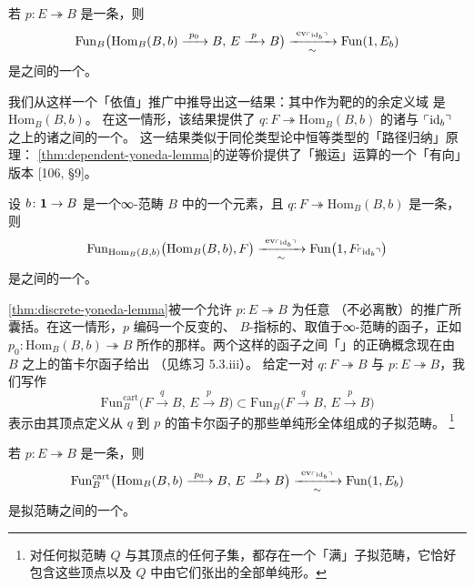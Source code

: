 \begin{theorem}[离散 Yoneda 引理]\label{thm:discrete-yoneda-lemma}
若 $p\colon E\twoheadrightarrow B$ 是一条\trDiscreteCartesianFibration，则
\[
\mathrm{Fun}_{B}\bigl(\mathrm{Hom}_{B}(B,b)\xrightarrow{\ p_{0}\ }B,\,
E\xrightarrow{\ p\ }B\bigr)
\xrightarrow[\ \sim\ ]{\ \mathrm{ev}_{\qcor{\mathrm{id}_{b}}}\ }
\mathrm{Fun}(1,E_{b})
\]
是\trKanComplex{}之间的一个\trEquivalence。
\end{theorem}

我们从这样一个「依值」推广中推导出这一结果：其中作为靶的\trDiscreteCartesianFibration{}的余定义域
是 $\mathrm{Hom}_{B}(B,b)$。
在这一情形，该结果提供了\trDiscreteCartesianFibration
$q\colon F\twoheadrightarrow\mathrm{Hom}_{B}(B,b)$ 的诸\trSection{}与
$\ulcorner\mathrm{id}_{b}\urcorner$ 之上\trFiber{}的诸\trElement{}之间的一个\trEquivalence。
这一结果类似于同伦类型论中恒等类型的「路径归纳」原理：
\cref{thm:dependent-yoneda-lemma}的逆等价提供了「搬运」运算的一个「有向」版本
[106, §9]。

\begin{theorem}[依值 Yoneda 引理]\label{thm:dependent-yoneda-lemma}
设 $b\colon\mathbf{1}\to B$ 是一个∞-范畴 $B$ 中的一个元素，且
$q\colon F\twoheadrightarrow\mathrm{Hom}_{B}(B,b)$ 是一条\trDiscreteCartesianFibration，则
\[
\mathrm{Fun}_{\mathrm{Hom}_{B}(B,b)}\bigl(\mathrm{Hom}_{B}(B,b),F\bigr)
\xrightarrow[\ \sim\ ]{\ \mathrm{ev}_{\ulcorner\mathrm{id}_{b}\urcorner}\ }
\mathrm{Fun}\bigl(1,F_{\ulcorner\mathrm{id}_{b}\urcorner}\bigr)
\]
是\trKanComplex{}之间的一个\trEquivalence。
\end{theorem}

\cref{thm:discrete-yoneda-lemma}被一个允许 $p\colon E\twoheadrightarrow B$ 为任意%
\trCartesianFibration{}（不必离散）的推广所囊括。在这一情形，$p$ 编码一个反变的、
$B$-指标的、取值于∞-范畴的函子，正如 $p_{0}\colon\mathrm{Hom}_{B}(B,b)\twoheadrightarrow B$
所作的那样。两个这样的函子之间「\trNaturalTransformation」的正确概念现在由 $B$ 之上的笛卡尔函子给出
（见练习 5.3.iii）。
给定一对\trCartesianFibration{} $q\colon F\twoheadrightarrow B$ 与
$p\colon E\twoheadrightarrow B$，我们写作
\[
\mathrm{Fun}_{B}^{\mathrm{cart}}\bigl(F\xrightarrow{\ q\ }B,\,
E\xrightarrow{\ p\ }B\bigr)
\subset
\mathrm{Fun}_{B}\bigl(F\xrightarrow{\ q\ }B,\,
E\xrightarrow{\ p\ }B\bigr)
\]
表示由其顶点定义从 $q$ 到 $p$ 的笛卡尔函子的那些单纯形全体组成的子拟范畴。
\footnote{对任何拟范畴 $Q$ 与其顶点的任何子集，都存在一个「满」子拟范畴，它恰好
包含这些顶点以及 $Q$ 中由它们张出的全部单纯形。}

\begin{theorem}[\trYonedaLemma]\label{thm:yoneda-lemma}
若 $p\colon E\twoheadrightarrow B$ 是一条\trCartesianFibration，则
\[
\mathrm{Fun}_{B}^{\mathrm{cart}}\bigl(\mathrm{Hom}_{B}(B,b)
\xrightarrow{\ p_{0}\ }B,\,
E\xrightarrow{\ p\ }B\bigr)
\xrightarrow[\ \sim\ ]{\ \mathrm{ev}_{\ulcorner\mathrm{id}_{b}\urcorner}\ }
\mathrm{Fun}(1,E_{b})
\]
是拟范畴之间的一个\trEquivalence。
\end{theorem}

